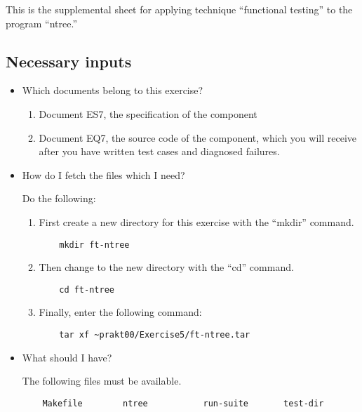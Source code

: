 
This is the supplemental sheet 
for applying technique ``functional testing''
to the program ``ntree.''


\subsection*{Necessary inputs}

\begin{itemize}

\item Which documents belong to this exercise?

\begin{enumerate}
\item Document ES7, the specification of the component
\item Document EQ7, the source code of the component, which you will
receive after you have written test cases and diagnosed failures.
\end{enumerate}

\item How do I fetch the files which I need?

Do the following:

\begin{enumerate}

\item First create a new directory for this exercise with the
``mkdir'' command.
\begin{verbatim}
    mkdir ft-ntree
\end{verbatim}

\item Then change to the new directory with the ``cd'' command.
\begin{verbatim}
    cd ft-ntree
\end{verbatim}

\item Finally, enter the following command:
\begin{path}
\begin{verbatim}
    tar xf ~prakt00/Exercise5/ft-ntree.tar
\end{verbatim}
\end{path}

\end{enumerate}


\item What should I have?

The following files must be available.
\begin{verbatim}
    Makefile        ntree           run-suite       test-dir
\end{verbatim}

\end{itemize}


